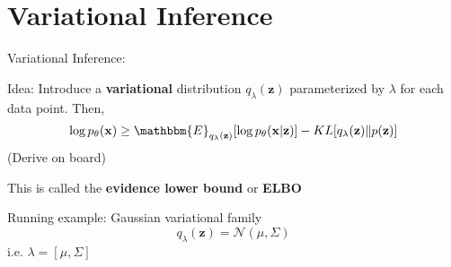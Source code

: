 \documentclass{beamer}
\let\tempone\itemize
\let\temptwo\enditemize
\renewenvironment{itemize}{\tempone\addtolength{\itemsep}{0.5\baselineskip}}{\temptwo}
\newcommand{\zvec}{\mathbf{z}}
\newcommand{\E}{\mathbbm{E}}
\newcommand{\xvec}{\mathbf{x}}
\begin{document}

\section{Variational Inference}
\begin{frame}
  \begin{center}
   \end{center}
Variational Inference:
\begin{itemize}
\item Idea: Introduce a \textbf{variational} distribution $q_\lambda(\zvec)$
parameterized by $\lambda$ for each data point. Then,
\begin{align*}
\log p_\theta(\xvec) \ge \E_{q_\lambda(\zvec)} [\log p_\theta(\xvec|\zvec)] - KL[q_\lambda(\zvec) \Vert p(\zvec)]
\end{align*}
(Derive on board)
\item This is called the \textbf{evidence lower bound} or \textbf{ELBO}
\item Running example: Gaussian variational family 
\[ q_\lambda(\zvec) = \mathcal{N}(\mu , \Sigma)\]
i.e. $\lambda = [\mu, \Sigma]$
\end{itemize}
\end{frame}
\end{document}

